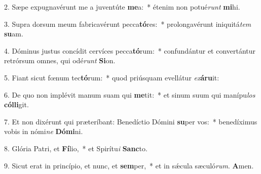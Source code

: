 2. Sæpe expugnavérunt me a juventúte \textbf{me}a:~*  étenim non potué\textit{runt} \textbf{mi}hi.\

3. Supra dorsum meum fabricavérunt pecca\textbf{tó}res:~*  prolongavérunt iniquitá\textit{tem} \textbf{su}am.\

4. Dóminus justus concídit cervíces pecca\textbf{tó}rum:~*  confundántur et convertántur retrórsum omnes, qui odé\textit{runt} \textbf{Si}on.\

5. Fiant sicut fœnum tec\textbf{tó}rum:~*  quod priúsquam evellátur \textit{ex}\textbf{á}\textbf{ru}it:\

6. De quo non implévit manum suam qui \textbf{me}tit:~*  et sinum suum qui manípu\textit{los} \textbf{cól}\textbf{li}git.\

7. Et non dixérunt qui præteríbant: Benedíctio Dómini \textbf{su}per vos:~*  benedíximus vobis in nómi\textit{ne} \textbf{Dó}\textbf{mi}ni.\

8. Glória Patri, et \textbf{Fí}lio,~*  et Spirítu\textit{i} \textbf{Sanc}to.\

9. Sicut erat in princípio, et nunc, et \textbf{sem}per,~*  et in sǽcula sæculó\textit{rum}. \textbf{A}men.\

